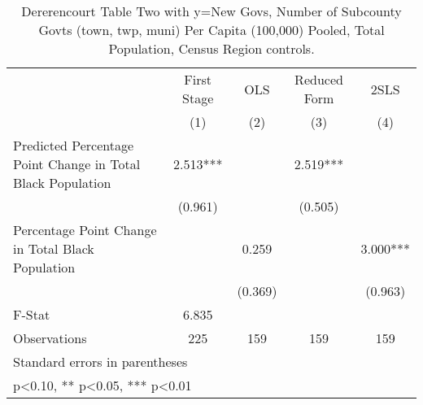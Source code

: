 \begin{table}[htbp]\centering
\def\sym#1{\ifmmode^{#1}\else\(^{#1}\)\fi}
\caption{Dererencourt Table Two with y=New Govs, Number of Subcounty Govts (town, twp, muni) Per Capita (100,000) Pooled, Total Population, Census Region controls.}
\begin{tabular}{l*{4}{c}}
\toprule
                    & First Stage   &         OLS   &Reduced Form   &        2SLS   \\
                    &\multicolumn{1}{c}{(1)}   &\multicolumn{1}{c}{(2)}   &\multicolumn{1}{c}{(3)}   &\multicolumn{1}{c}{(4)}   \\
\midrule
Predicted Percentage Point Change in Total Black Population&       2.513***&               &       2.519***&               \\
                    &     (0.961)   &               &     (0.505)   &               \\
\addlinespace
Percentage Point Change in Total Black Population&               &       0.259   &               &       3.000***\\
                    &               &     (0.369)   &               &     (0.963)   \\
\midrule
F-Stat              &       6.835   &               &               &               \\
Observations        &         225   &         159   &         159   &         159   \\
\bottomrule
\multicolumn{5}{l}{\footnotesize Standard errors in parentheses}\\
\multicolumn{5}{l}{\footnotesize * p<0.10, ** p<0.05, *** p<0.01}\\
\end{tabular}
\end{table}
